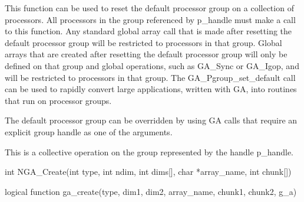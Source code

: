 \documentclass[12pt]{article}
\begin{document}
\begin{desc}

  This function can be used to reset the default processor group on a
  collection of processors. All processors in the group referenced by
  p_handle must make a call to this function. Any standard global
  array call that is made after resetting the default processor group
  will be restricted to processors in that group. Global arrays that
  are created after resetting the default processor group will only be
  defined on that group and global operations, such as GA_Sync or
  GA_Igop, and will be restricted to processors in that group. The
  GA_Pgroup_set_default call can be used to rapidly convert large
  applications, written with GA, into routines that run on processor
  groups.

  The default processor group can be overridden by using GA calls that
  require an explicit group handle as one of the arguments.

  This is a collective operation on the group represented by the
  handle p_handle.

\end{desc}


\begin{capi}
\begin{ccode}
int NGA_Create(int type, int ndim, int dims[], char *array_name, int chunk[])
\end{ccode}
\begin{funcargs}
\end{funcargs}
\end{capi}

\begin{f2dapi}
\begin{fcode}
logical function ga_create(type, dim1, dim2, array_name, chunk1, chunk2, g_a)
\end{fcode}
\begin{funcargs}
\end{funcargs}
\end{f2dapi}
\end{document}
